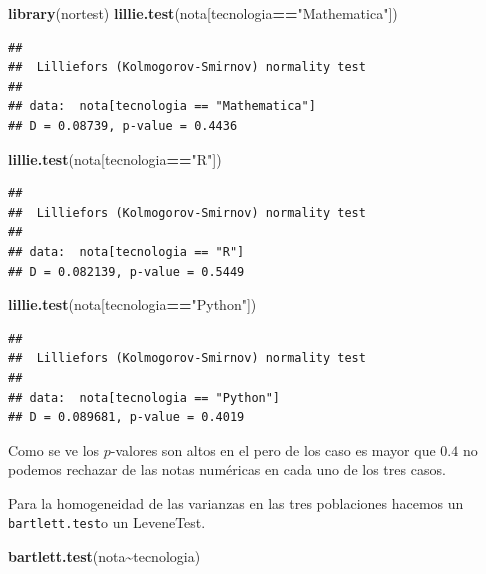 \documentclass[
]{article}
\newenvironment{Shaded}{\begin{snugshade}}{\end{snugshade}}
\newcommand{\KeywordTok}[1]{\textcolor[rgb]{0.13,0.29,0.53}{\textbf{#1}}}
\newcommand{\NormalTok}[1]{#1}
\newcommand{\OperatorTok}[1]{\textcolor[rgb]{0.81,0.36,0.00}{\textbf{#1}}}
\newcommand{\StringTok}[1]{\textcolor[rgb]{0.31,0.60,0.02}{#1}}
\begin{document}
\begin{Shaded}
\begin{Highlighting}[]
\KeywordTok{library}\NormalTok{(nortest)}
\KeywordTok{lillie.test}\NormalTok{(nota[tecnologia}\OperatorTok{==}\StringTok{"Mathematica"}\NormalTok{])}
\end{Highlighting}
\end{Shaded}

\begin{verbatim}
## 
##  Lilliefors (Kolmogorov-Smirnov) normality test
## 
## data:  nota[tecnologia == "Mathematica"]
## D = 0.08739, p-value = 0.4436
\end{verbatim}

\begin{Shaded}
\begin{Highlighting}[]
\KeywordTok{lillie.test}\NormalTok{(nota[tecnologia}\OperatorTok{==}\StringTok{"R"}\NormalTok{])}
\end{Highlighting}
\end{Shaded}

\begin{verbatim}
## 
##  Lilliefors (Kolmogorov-Smirnov) normality test
## 
## data:  nota[tecnologia == "R"]
## D = 0.082139, p-value = 0.5449
\end{verbatim}

\begin{Shaded}
\begin{Highlighting}[]
\KeywordTok{lillie.test}\NormalTok{(nota[tecnologia}\OperatorTok{==}\StringTok{"Python"}\NormalTok{])}
\end{Highlighting}
\end{Shaded}

\begin{verbatim}
## 
##  Lilliefors (Kolmogorov-Smirnov) normality test
## 
## data:  nota[tecnologia == "Python"]
## D = 0.089681, p-value = 0.4019
\end{verbatim}

Como se ve los \(p\)-valores son altos en el pero de los caso es mayor
que \(0.4\) no podemos rechazar de las notas numéricas en cada uno de
los tres casos.

Para la homogeneidad de las varianzas en las tres poblaciones hacemos un
\texttt{bartlett.test}o un LeveneTest.

\begin{Shaded}
\begin{Highlighting}[]
\KeywordTok{bartlett.test}\NormalTok{(nota}\OperatorTok{\textasciitilde{}}\NormalTok{tecnologia)}
\end{Highlighting}
\end{Shaded}
\end{document}
